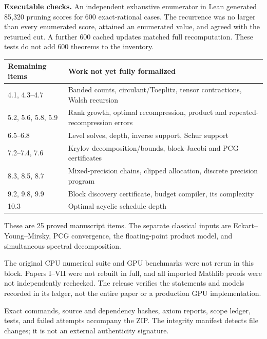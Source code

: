 \textbf{Executable checks.} An independent exhaustive enumerator in Lean generated 85,320 pruning scores for 600 exact-rational cases. The recurrence was no larger than every enumerated score, attained an enumerated value, and agreed with the returned cut. A further 600 cached updates matched full recomputation. These tests do not add 600 theorems to the inventory.

\begin{center}\small
\renewcommand{\arraystretch}{1.2}
\begin{tabular}{@{}p{}p{}@{}}
\toprule
Remaining items & Work not yet fully formalized\\
\midrule
4.1, 4.3--4.7 & Banded counts, circulant/Toeplitz, tensor contractions, Walsh recursion\\
5.2, 5.6, 5.8, 5.9 & Rank growth, optimal recompression, product and repeated-recompression errors\\
6.5--6.8 & Level solves, depth, inverse support, Schur support\\
7.2--7.4, 7.6 & Krylov decomposition/bounds, block-Jacobi and PCG certificates\\
8.3, 8.5, 8.7 & Mixed-precision chains, clipped allocation, discrete precision program\\
9.2, 9.8, 9.9 & Block discovery certificate, budget compiler, its complexity\\
10.3 & Optimal acyclic schedule depth\\
\bottomrule
\end{tabular}
\end{center}
These are 25 proved manuscript items. The separate classical inputs are Eckart--Young--Mirsky, PCG convergence, the floating-point product model, and simultaneous spectral decomposition.

The original CPU numerical suite and GPU benchmarks were not rerun in this block. Papers I--VII were not rebuilt in full, and all imported Mathlib proofs were not independently rechecked. The release verifies the statements and models recorded in its ledger, not the entire paper or a production GPU implementation.

Exact commands, source and dependency hashes, axiom reports, scope ledger, tests, and failed attempts accompany the ZIP. The integrity manifest detects file changes; it is not an external authenticity signature.
